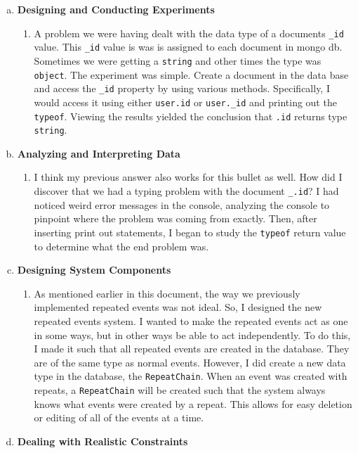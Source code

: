\documentclass[11pt]{article}   %
\begin{document}
\begin{enumerate} [a)]
\item  {\bf Designing and Conducting Experiments}
\begin{enumerate} [$\cdot$]
\item A problem we were having dealt with the data type of a documents \texttt{\_id} value. This \texttt{\_id} value is was is assigned to each document in mongo db. Sometimes we were getting a \texttt{string} and other times the type was \texttt{object}. The experiment was simple. Create a document in the data base and access the \texttt{\_id} property by using various methods. Specifically, I would access it using either \texttt{user.id} or \texttt{user.\_id} and printing out the \texttt{typeof}. Viewing the results yielded the conclusion that \texttt{.id} returns type \texttt{string}.
\end{enumerate}
\item  {\bf Analyzing and Interpreting Data}
\begin{enumerate} [$\cdot$]
\item I think my previous answer also works for this bullet as well. How did I discover that we had a typing problem with the document \texttt{\_.id}? I had noticed weird error messages in the console, analyzing the console to pinpoint where the problem was coming from exactly. Then, after inserting print out statements, I began to study the \texttt{typeof} return value to determine what the end problem was. 
\end{enumerate}
\item {\bf Designing System Components}
\begin{enumerate} [$\cdot$]
\item As mentioned earlier in this document, the way we previously implemented repeated events was not ideal. So, I designed the new repeated events system. I wanted to make the repeated events act as one in some ways, but in other ways be able to act independently. To do this, I made it such that all repeated events are created in the database. They are of the same type as normal events. However, I did create a new data type in the database, the \texttt{RepeatChain}. When an event was created with repeats, a \texttt{RepeatChain} will be created such that the system always knows what events were created by a repeat. This allows for easy deletion or editing of all of the events at a time.
\end{enumerate}
\item {\bf Dealing with Realistic Constraints}

\end{enumerate}
\end{document}
